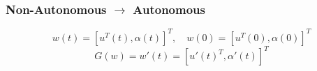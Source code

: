 \subsubsection{Non-Autonomous \texorpdfstring{$\rightarrow$}{->} Autonomous}
    \vspace{2pt}
    $$
        w(t) = [u^T(t), \alpha(t)]^T, \quad w(0) = [u^T(0), \alpha(0)]^T
    $$
    $$
        G(w) = w'(t) = [u'(t)^T, \alpha'(t)]^T
    $$
    \vspace{-1em}
